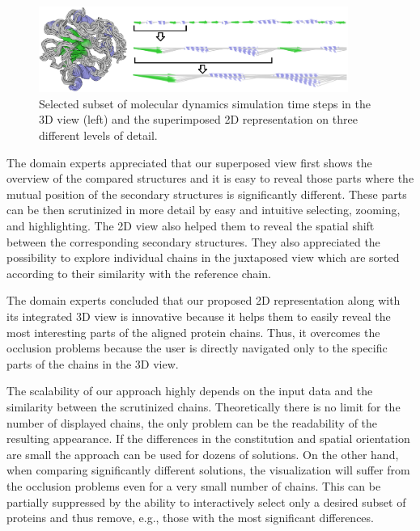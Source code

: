 \documentclass[twocolumn]{bmcart}%
\begin{document}
\begin{figure}[hbt]
  \centering
  \includegraphics[width=0.9\textwidth]{pics/case2.png}
  \caption{Selected subset of molecular dynamics simulation time steps in the 3D view (left) and the superimposed 2D representation on three different levels of detail.}
  \label{fig:case2}
\end{figure}

The domain experts appreciated that our superposed view first shows the overview of the compared structures and it is easy to reveal those parts where the mutual position of the secondary structures is significantly different.
These parts can be then scrutinized in more detail by easy and intuitive selecting, zooming, and highlighting.
The 2D view also helped them to reveal the spatial shift between the corresponding secondary structures.
They also appreciated the possibility to explore individual chains in the juxtaposed view which are sorted according to their similarity with the reference chain.

The domain experts concluded that our proposed 2D representation along with its integrated 3D view is innovative because it helps them to easily reveal the most interesting parts of the aligned protein chains.
Thus, it overcomes the occlusion problems because the user is directly navigated only to the specific parts of the chains in the 3D view.

The scalability of our approach highly depends on the input data and the similarity between the scrutinized chains.
Theoretically there is no limit for the number of displayed chains, the only problem can be the readability of the resulting appearance.
If the differences in the constitution and spatial orientation are small the approach can be used for dozens of solutions.
On the other hand, when comparing significantly different solutions, the visualization will suffer from the occlusion problems even for a very small number of chains.
This can be partially suppressed by the ability to interactively select only a desired subset of proteins and thus remove, e.g., those with the most significant differences.
\end{document}
